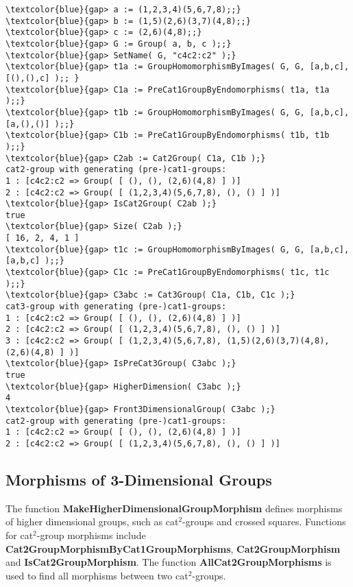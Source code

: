 \documentclass[a4paper,11pt]{article}
\theoremstyle{plain}
\theoremstyle{definition}
\begin{document}
\begin{Verbatim}[frame=single, fontsize=\small, commandchars=\\\{\}]
\textcolor{blue}{gap> a := (1,2,3,4)(5,6,7,8);;}
\textcolor{blue}{gap> b := (1,5)(2,6)(3,7)(4,8);;}
\textcolor{blue}{gap> c := (2,6)(4,8);;}
\textcolor{blue}{gap> G := Group( a, b, c );;}
\textcolor{blue}{gap> SetName( G, "c4c2:c2" );}
\textcolor{blue}{gap> t1a := GroupHomomorphismByImages( G, G, [a,b,c], [(),(),c] );; }
\textcolor{blue}{gap> C1a := PreCat1GroupByEndomorphisms( t1a, t1a );;}
\textcolor{blue}{gap> t1b := GroupHomomorphismByImages( G, G, [a,b,c], [a,(),()] );;}
\textcolor{blue}{gap> C1b := PreCat1GroupByEndomorphisms( t1b, t1b );;}
\textcolor{blue}{gap> C2ab := Cat2Group( C1a, C1b );}
cat2-group with generating (pre-)cat1-groups:
1 : [c4c2:c2 => Group( [ (), (), (2,6)(4,8) ] )]
2 : [c4c2:c2 => Group( [ (1,2,3,4)(5,6,7,8), (), () ] )]
\textcolor{blue}{gap> IsCat2Group( C2ab );}
true
\textcolor{blue}{gap> Size( C2ab );}
[ 16, 2, 4, 1 ]
\textcolor{blue}{gap> t1c := GroupHomomorphismByImages( G, G, [a,b,c], [a,b,c] );;}
\textcolor{blue}{gap> C1c := PreCat1GroupByEndomorphisms( t1c, t1c );;}
\textcolor{blue}{gap> C3abc := Cat3Group( C1a, C1b, C1c );}
cat3-group with generating (pre-)cat1-groups:
1 : [c4c2:c2 => Group( [ (), (), (2,6)(4,8) ] )]
2 : [c4c2:c2 => Group( [ (1,2,3,4)(5,6,7,8), (), () ] )]
3 : [c4c2:c2 => Group( [ (1,2,3,4)(5,6,7,8), (1,5)(2,6)(3,7)(4,8),
(2,6)(4,8) ] )]
\textcolor{blue}{gap> IsPreCat3Group( C3abc );}
true
\textcolor{blue}{gap> HigherDimension( C3abc );}
4
\textcolor{blue}{gap> Front3DimensionalGroup( C3abc );} 
cat2-group with generating (pre-)cat1-groups:
1 : [c4c2:c2 => Group( [ (), (), (2,6)(4,8) ] )]
2 : [c4c2:c2 => Group( [ (1,2,3,4)(5,6,7,8), (), () ] )]
\end{Verbatim}


\subsection{Morphisms of 3-Dimensional Groups}

The function \textbf{MakeHigherDimensionalGroupMorphism} defines morphisms of 
higher dimensional groups, such as cat$^{2}$-groups and crossed squares. 
Functions for cat$^{2}$-group morphisms include 
\textbf{Cat2GroupMorphismByCat1GroupMorphisms}, \textbf{Cat2GroupMorphism} and 
\textbf{IsCat2GroupMorphism}. 
The function \textbf{AllCat2GroupMorphisms} is used to find 
all morphisms between two cat$^{2}$-groups.
\end{document}
